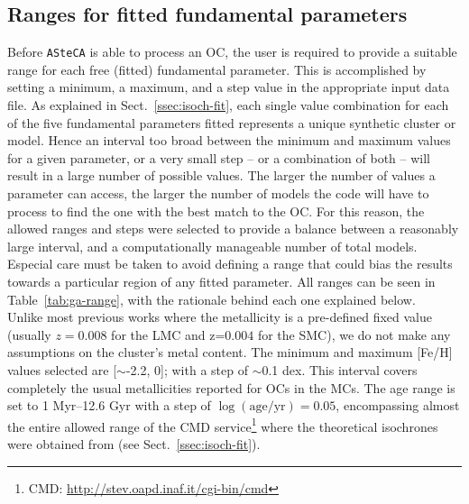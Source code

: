\documentclass[a4paper,fleqn,usenatbib]{mnras}
\begin{document}

\subsection{Ranges for fitted fundamental parameters}
\label{ssec:param-ranges}

Before \texttt{ASteCA} is able to process an OC, the user is required to provide
a suitable range for each free (fitted) fundamental parameter. This is
accomplished by setting a minimum, a maximum, and a step value in the
appropriate input data file.
%
As explained in Sect.~\ref{ssec:isoch-fit}, each single value combination
for each of the five fundamental parameters fitted represents a unique synthetic
cluster or model.
%
Hence an interval too broad between the minimum and maximum
values for a given parameter, or a very small step -- or a combination of
both -- will result in a large number of possible values.
The larger the number of values a parameter can access, the larger the number of
models the code will have to process to find the one with the best match to the
OC\@.
%
For this reason, the allowed ranges and steps were selected to provide
a balance between a reasonably large interval, and a computationally manageable
number of total models.
Especial care must be taken to avoid defining a range that could bias the
results towards a particular region of any fitted parameter.
All ranges can be seen in Table~\ref{tab:ga-range}, with the rationale behind
each one explained below.\\

Unlike most previous works where the metallicity is a pre-defined fixed
value (usually $z=0.008$ for the LMC and z=$0.004$ for the SMC), we do not make
any assumptions on the cluster's metal content. The minimum and maximum [Fe/H]
values selected are [$\sim$-2.2, 0]; with a step of $\sim$0.1 dex. This interval
covers completely the usual metallicities reported for OCs in the MCs.
The age range is set to 1 Myr--12.6 Gyr with a step of
$\log\mathrm{(age/yr)}=0.05$, encompassing almost the entire allowed range of
the CMD service\footnote{CMD\@: \url{http://stev.oapd.inaf.it/cgi-bin/cmd}}
where the theoretical isochrones were obtained from (see
Sect.~\ref{ssec:isoch-fit}).
\end{document}
